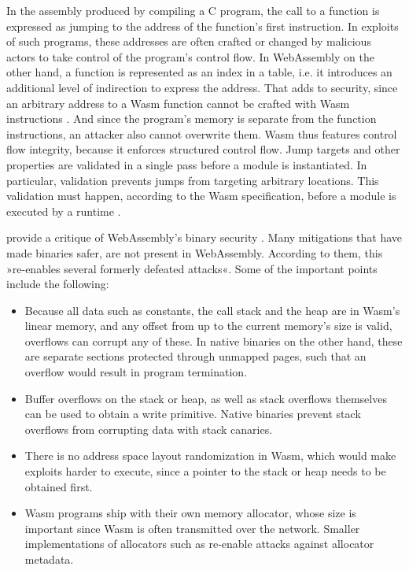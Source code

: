 In the assembly produced by compiling a C program, the call to a function is expressed as jumping to the address of the function's first instruction. In exploits of such programs, these addresses are often crafted or changed by malicious actors to take control of the program's control flow. In WebAssembly on the other hand, a function is represented as an index in a table, i.e. it introduces an additional level of indirection to express the address. That adds to security, since an arbitrary address to a Wasm function cannot be crafted with Wasm instructions \cite{Denis2019}. And since the program's memory is separate from the function instructions, an attacker also cannot overwrite them.
Wasm thus features control flow integrity, because it enforces structured control flow. Jump targets and other properties are validated in a single pass before a module is instantiated. In particular, validation prevents jumps from targeting arbitrary locations. This validation must happen, according to the Wasm specification, before a module is executed by a runtime \cite{Haas2017}.

\citeauthor{Lehmann2020} provide a critique of WebAssembly's binary security \cite{Lehmann2020}. Many mitigations that have made  binaries safer, are not present in WebAssembly. According to them, this »re-enables several formerly defeated attacks«. Some of the important points include the following:

\begin{itemize}
    \item Because all data such as constants, the call stack and the heap are in Wasm's linear memory, and any offset from up to the current memory's size is valid, overflows can corrupt any of these. In native binaries on the other hand, these are separate sections protected through unmapped pages, such that an overflow would result in program termination.
    \item Buffer overflows on the stack or heap, as well as stack overflows themselves can be used to obtain a write primitive. Native binaries prevent stack overflows from corrupting data with stack canaries.
    \item There is no address space layout randomization in Wasm, which would make exploits harder to execute, since a pointer to the stack or heap needs to be obtained first.
    \item Wasm programs ship with their own memory allocator, whose size is important since Wasm is often transmitted over the network. Smaller implementations of allocators such as  re-enable attacks against allocator metadata.
\end{itemize}

